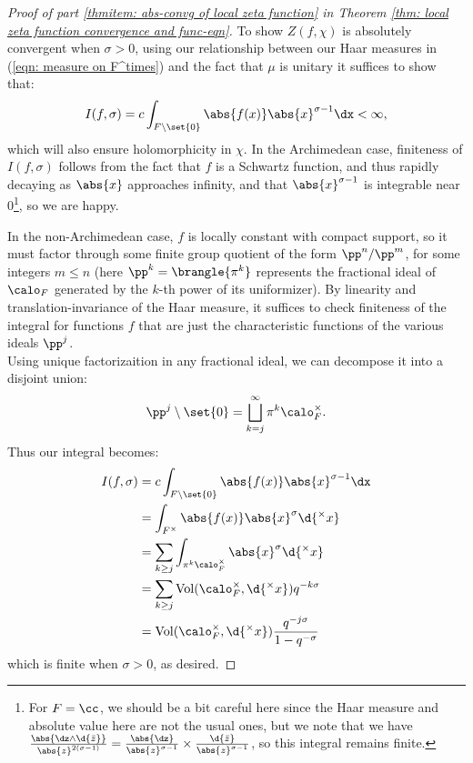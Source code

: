 \documentclass[11pt, x11names, openany]{book}
\begin{document}
\begin{proof}[Proof of part \ref{thmitem: abs-convg of local zeta function} in Theorem \ref{thm: local zeta function convergence and func-eqn}]
To show $Z(f, \chi)$ is absolutely convergent when $\sigma > 0$, using our relationship between our Haar measures in (\ref{eqn: measure on F^times}) and the fact that $\mu$ is unitary it suffices to show that:
\begin{equation*}
    I(f, \sigma) = c \int_{F \setminus \set{0}} \abs{f(x)} \abs{x}^{\sigma - 1} \dx < \infty,
\end{equation*}
which will also ensure holomorphicity in $\chi$. In the Archimedean case, finiteness of $I(f, \sigma)$ follows from the fact that $f$ is a Schwartz function, and thus rapidly decaying as $\abs{x}$ approaches infinity, and that $\abs{x}^{\sigma - 1}$ is integrable near 0\footnote{For $F = \cc$, we should be a bit careful here since the Haar measure and absolute value here are not the usual ones, but we note that we have $\frac{\abs{\dz \wedge \d{\bar{z}}}}{\abs{z}^{2(\sigma - 1)}} = \frac{\abs{\dz}}{\abs{z}^{\sigma - 1}} \times \frac{\d{\bar{z}}}{\abs{z}^{\sigma - 1}}$, so this integral remains finite.}, so we are happy.


In the non-Archimedean case, $f$ is locally constant with compact support, so it must factor through some finite group quotient of the form $\pp^n/\pp^m$, for some integers $m \leq n$ (here $\pp^k = \brangle{\pi^k}$ represents the fractional ideal of $\calo_F$ generated by the $k$-th power of its uniformizer). By linearity and translation-invariance of the Haar measure, it suffices to check finiteness of the integral for functions $f$ that are just the characteristic functions of the various ideals $\pp^j$.\\
Using unique factorizaition in any fractional ideal, we can decompose it into a disjoint union:
\begin{equation*}
    \pp^j \setminus \set{0} = \bigsqcup^\infty_{k=j} \pi^k \calo_F^\times.
\end{equation*}
Thus our integral becomes:
\begin{align*}
        I(f, \sigma) &= c \int_{F \setminus \set{0}} \abs{f(x)} \abs{x}^{\sigma - 1} \dx \\
        &= \int_{F^\times} \abs{f(x)} \abs{x}^\sigma \d{^\times x}\\
        &= \sum_{k \geq j} \int_{\pi^k \calo_F^\times} \abs{x}^\sigma \d{^\times x}\\
        &= \sum_{k \geq j}\vol(\calo_F^\times, \d{^\times x})q^{-k \sigma}\\
        &= \vol(\calo_F^\times, \d{^\times x}) \frac{q^{-j\sigma}}{1 - q^{- \sigma}}
\end{align*}
which is finite when $\sigma > 0$, as desired.
\end{proof}
\end{document}
